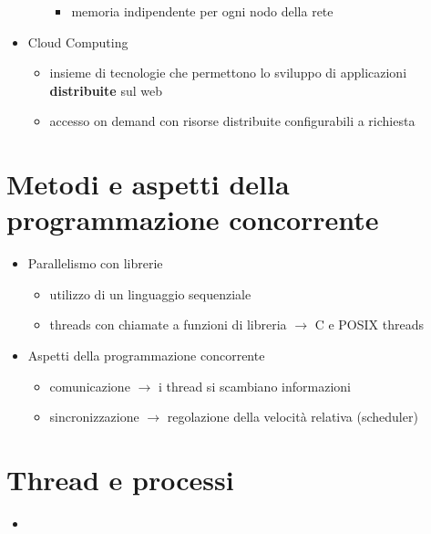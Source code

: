 \documentclass[12pt]{extarticle}
\begin{document}
\begin{itemize}
\begin{itemize}
\begin{itemize}
            \item memoria indipendente per ogni nodo della rete
        \end{itemize}
    \end{itemize}
    \item Cloud Computing
    \begin{itemize}
        \item insieme di tecnologie che permettono lo sviluppo di applicazioni \textbf{distribuite} sul web
        \item accesso on demand con risorse distribuite configurabili a richiesta
    \end{itemize}
\end{itemize}

\newpage

\section*{Metodi e aspetti della programmazione concorrente}

\begin{itemize}
    \item Parallelismo con librerie
    \begin{itemize}
        \item utilizzo di un linguaggio sequenziale
        \item threads con chiamate a funzioni di libreria $\rightarrow$ C e POSIX threads
    \end{itemize}
    \item Aspetti della programmazione concorrente
    \begin{itemize}
        \item comunicazione $\rightarrow$ i thread si scambiano informazioni
        \item sincronizzazione $\rightarrow$ regolazione della velocità relativa (scheduler)
    \end{itemize}
\end{itemize}

\section*{Thread e processi}

\begin{itemize}
    \item 
\end{itemize}
\end{document}
